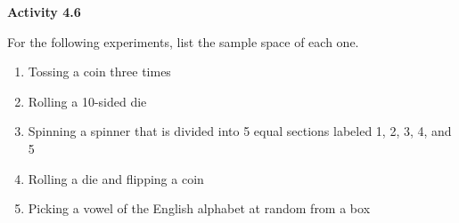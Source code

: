  \vspace{1ex}
\noindent\textbf{Activity 4.6}

\vspace{0.75ex}


For the following experiments, list the sample space of each one.

\begin{enumerate}
    \item Tossing a coin three times
    
    \item Rolling a 10-sided die

    \item Spinning a spinner that is divided into 5 equal sections labeled 1, 2, 3, 4, and 5
    
    \item Rolling a die and flipping a coin

    \item Picking a vowel of the English alphabet at random
    from a box

\end{enumerate}

